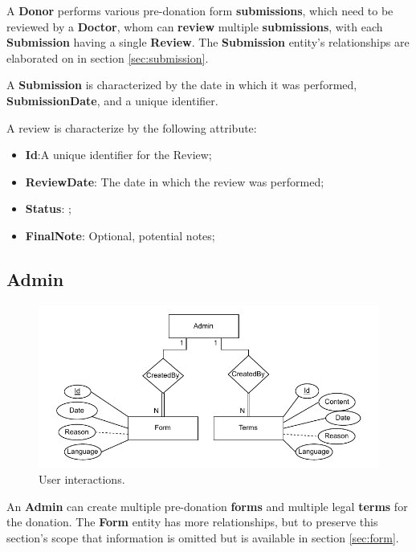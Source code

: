 A \textbf{Donor} performs various pre-donation form \textbf{submissions}, which need to be reviewed by a \textbf{Doctor}, whom can \textbf{review} multiple \textbf{submissions},  with each \textbf{Submission} having a single \textbf{Review}.
The \textbf{Submission} entity's relationships are elaborated on in section \ref{sec:submission}.

A \textbf{Submission} is characterized by the date in which it was performed, \textbf{SubmissionDate}, and a unique identifier.

A review is characterize by the following attribute:
\begin{itemize}
	\item \textbf{Id}:A unique identifier for the Review;
	\item \textbf{ReviewDate}: The date in which the review was performed;
	\item \textbf{Status}: ;
	\item \textbf{FinalNote}: Optional, potential notes;
\end{itemize}





\subsection{Admin}

\begin{figure}[h]
	\begin{center}
		\includegraphics[width=\textwidth,height=\textheight,keepaspectratio]{./figures/Admin_Entity.pdf}
	\end{center}
	\caption{User interactions.}\label{fig:admin_entity}
\end{figure}

An \textbf{Admin} can create multiple pre-donation \textbf{forms} and multiple legal \textbf{terms} for the donation.
The \textbf{Form} entity has more relationships, but to preserve this section's scope that information is omitted but is available in section \ref{sec:form}.

